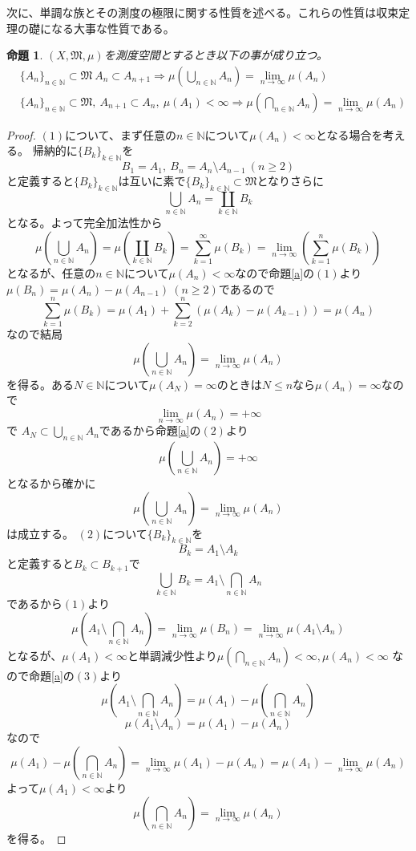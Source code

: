 \documentclass[leqno]{jsarticle}
\newtheorem{prop}[thm]{命題}
\newcommand{\To}{\Longrightarrow}
\newcommand{\nn}{\mathbb{N}}
\newcommand{\mgn}{\infty}
\newcommand{\mm}{\mathfrak{M}}
\begin{document}
次に、単調な族とその測度の極限に関する性質を述べる。これらの性質は収束定理の礎になる大事な性質である。
\setcounter{equation}{0}
\begin{prop}\label{lim}
$(X,\mm,\mu)$を測度空間とするとき以下の事が成り立つ。
	\begin{align}
	&\{A_n\}_{n\in \nn}\subset \mm\ A_n\subset A_{n+1}\To
	\mu \left(\bigcup_{n\in \mathbb{N}} A_{n}\right)=
	\lim_{n \to \infty}\mu (A_{n})\\ 
	&\{A_n\}_{n\in \nn}\subset \mm,\ A_{n+1}\subset A_{n},\ \mu(A_1)<\mgn\To
	 \mu \left(\bigcap_{n\in \mathbb{N}} A_{n}\right)=\lim_{n \to \infty}\mu (A_{n})
	\end{align}
\end{prop}
\begin{proof}$(1)$について、まず任意の$n\in\nn$について$\mu(A_n)<\mgn$となる場合を考える。
帰納的に$\{B_k\}_{k\in\nn}$を
\[
B_1=A_1,\ B_n=A_{n}\setminus A_{n-1}\ (n\ge2)
\]
と定義すると$\{B_k\}_{k\in\nn}$は互いに素で$\{B_k\}_{k\in\nn}\subset\mm$となりさらに
\[
\bigcup_{n\in\nn}A_n=\coprod_{k\in\nn}B_k
\]
となる。よって完全加法性から
\[
\mu\left(\bigcup_{n\in\nn}A_n\right)=
\mu\left(\coprod_{k\in\nn}B_k\right)=
\sum_{k=1}^{\mgn}\mu(B_k)=
\lim_{n\to \mgn}\left(\sum_{k=1}^n\mu(B_k)\right)
\]となるが、任意の$n\in\nn$について$\mu(A_n)<\mgn$なので命題\ref{a}の$(1)$より$\mu(B_n)=\mu(A_n)-\mu(A_{n-1})\ (n\ge 2)$であるので
\[
\sum_{k=1}^n\mu(B_k)=\mu(A_1)+\sum_{k=2}^n\left(\mu(A_{k})-\mu(A_{k-1})\right)=\mu(A_n)
\]
なので結局
\[
\mu \left(\bigcup_{n\in \mathbb{N}} A_{n}\right)=\lim_{n \to \infty}\mu (A_{n})
\]
を得る。ある$N\in\nn$について$\mu(A_N)=\mgn$のときは$N\le n$なら$\mu(A_n)=\mgn$なので
\[
\lim_{n\to\mgn}\mu(A_n)=+\mgn
\]
で
$A_N\subset \bigcup_{n\in\nn}A_n$であるから命題\ref{a}の$(2)$より
\[
\mu\left(\bigcup_{n\in\nn}A_n\right)=+\mgn
\]
となるから確かに
\[
\mu \left(\bigcup_{n\in \mathbb{N}} A_{n}\right)=\lim_{n \to \infty}\mu (A_{n})
\]
は成立する。
$(2)$について$\{B_k\}_{k\in\nn}$を
\[
B_k=A_1\setminus A_k
\]
と定義すると$B_k\subset B_{k+1}$で
\[
\bigcup_{k\in\nn}B_k=A_1\setminus \bigcap_{n\in \nn}A_n
\]
であるから$(1)$より
\[
\mu\left(A_1\setminus \bigcap_{n\in \nn}A_n\right)=
\lim_{n\to\mgn}\mu(B_n)=\lim_{n\to\mgn}\mu(A_1\setminus A_n)
\]
となるが、$\mu(A_1)<\mgn$と単調減少性より$\mu(\bigcap_{n\in \nn}A_n)<\mgn,\mu(A_n)<\mgn$
なので命題\ref{a}の$(3)$より
\[
\mu\left(A_1\setminus \bigcap_{n\in \nn}A_n\right)=
\mu(A_1)-\mu(\bigcap_{n\in \nn}A_n)
\]
\[
\mu(A_1\setminus A_n)=\mu(A_1)-\mu(A_n)
\]なので
\[
\mu(A_1)-\mu\left(\bigcap_{n\in \nn}A_n\right)=\lim_{n\to\mgn}\mu(A_1)-\mu(A_n)=\mu(A_1)-\lim_{n\to\mgn}\mu(A_n)
\]
よって$\mu(A_1)<\mgn$より
\[
\mu \left(\bigcap_{n\in \mathbb{N}} A_{n}\right)=\lim_{n \to \infty}\mu (A_{n})
\]
を得る。
\end{proof}
\end{document}
